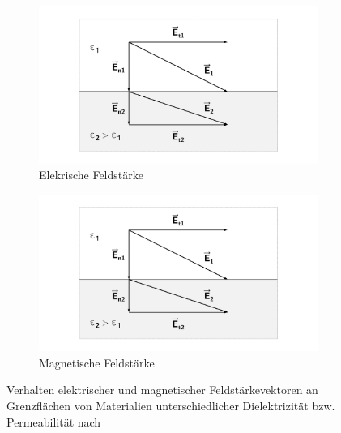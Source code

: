 \begin{figure}[ht]
    \centering
    \begin{subfigure}[c]{0.4\textwidth}
        \includegraphics[page = 1, width=\textwidth, trim = 4.8cm 1cm 4.8cm 1cm, clip]{Abbildungen/Kapitel2/Feldvektoren_an_Grenzflaechen.pdf}
        \caption{Elekrische Feldstärke}\label{subfig:2_Elektrische_Feldstaerke_an_Grenzflaeche}
    \end{subfigure}
    \hspace{2cm}
    \begin{subfigure}[c]{0.4\textwidth}
        \includegraphics[page = 2, width=\textwidth, trim = 4.8cm 1cm 4.8cm 1cm, clip]{Abbildungen/Kapitel2/Feldvektoren_an_Grenzflaechen.pdf}
        \caption{Magnetische Feldstärke}\label{subfig:2_Magnetische_Feldstaerke_an_Grenzflaeche}
    \end{subfigure}
    \caption{Verhalten elektrischer und magnetischer Feldstärkevektoren an Grenzflächen von \mbox{Materialien} unterschiedlicher Dielektrizität bzw. Permeabilität nach~\cite{EM_Schirmung}}
    \label{fig:2_Feldstaerken_an_Grenzflaechen}
\end{figure}

